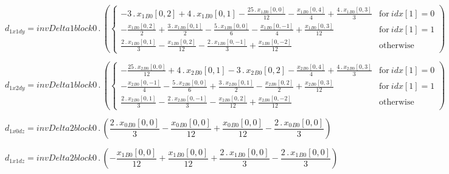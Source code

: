 \documentclass{article}
\begin{document}
\begin{dmath}d_{1 x1 dy} = invDelta1block0 \,.\, \left(\begin{cases} - 3 \,.\, {x_{1}{_{B0}}}[{0,2}] + 4 \,.\, {x_{1}{_{B0}}}[{0,1}] - \frac{25 \,.\, {x_{1}{_{B0}}}[{0,0}]}{12} - \frac{{x_{1}{_{B0}}}[{0,4}]}{4} + \frac{4 \,.\, 
{x_{1}{_{B0}}}[{0,3}]}{3} & \text{for}\: {idx}[{1}] = 0 \\- \frac{{x_{1}{_{B0}}}[{0,2}]}{2} + \frac{3 \,.\, {x_{1}{_{B0}}}[{0,1}]}{2} - \frac{5 \,.\, {x_{1}{_{B0}}}[{0,0}]}{6} - \frac{{x_{1}{_{B0}}}[{0,-1}]}{4} + \frac{{x_{1}{_{B0}}}[{0,3}]}{12} & 
\text{for}\: {idx}[{1}] = 1 \\\frac{2 \,.\, {x_{1}{_{B0}}}[{0,1}]}{3} - \frac{{x_{1}{_{B0}}}[{0,2}]}{12} - \frac{2 \,.\, {x_{1}{_{B0}}}[{0,-1}]}{3} + \frac{{x_{1}{_{B0}}}[{0,-2}]}{12} & \text{otherwise} \end{cases}\right)\end{dmath}

\begin{dmath}d_{1 x2 dy} = invDelta1block0 \,.\, \left(\begin{cases} - \frac{25 \,.\, {x_{2}{_{B0}}}[{0,0}]}{12} + 4 \,.\, {x_{2}{_{B0}}}[{0,1}] - 3 \,.\, {x_{2}{_{B0}}}[{0,2}] - \frac{{x_{2}{_{B0}}}[{0,4}]}{4} + \frac{4 \,.\, 
{x_{2}{_{B0}}}[{0,3}]}{3} & \text{for}\: {idx}[{1}] = 0 \\- \frac{{x_{2}{_{B0}}}[{0,-1}]}{4} - \frac{5 \,.\, {x_{2}{_{B0}}}[{0,0}]}{6} + \frac{3 \,.\, {x_{2}{_{B0}}}[{0,1}]}{2} - \frac{{x_{2}{_{B0}}}[{0,2}]}{2} + \frac{{x_{2}{_{B0}}}[{0,3}]}{12} & 
\text{for}\: {idx}[{1}] = 1 \\\frac{2 \,.\, {x_{2}{_{B0}}}[{0,1}]}{3} - \frac{2 \,.\, {x_{2}{_{B0}}}[{0,-1}]}{3} - \frac{{x_{2}{_{B0}}}[{0,2}]}{12} + \frac{{x_{2}{_{B0}}}[{0,-2}]}{12} & \text{otherwise} \end{cases}\right)\end{dmath}

\begin{dmath}d_{1 x0 dz} = invDelta2block0 \,.\, \left(\frac{2 \,.\, {x_{0}{_{B0}}}[{0,0}]}{3} - \frac{{x_{0}{_{B0}}}[{0,0}]}{12} + \frac{{x_{0}{_{B0}}}[{0,0}]}{12} - \frac{2 \,.\, {x_{0}{_{B0}}}[{0,0}]}{3}\right)\end{dmath}

\begin{dmath}d_{1 x1 dz} = invDelta2block0 \,.\, \left(- \frac{{x_{1}{_{B0}}}[{0,0}]}{12} + \frac{{x_{1}{_{B0}}}[{0,0}]}{12} + \frac{2 \,.\, {x_{1}{_{B0}}}[{0,0}]}{3} - \frac{2 \,.\, {x_{1}{_{B0}}}[{0,0}]}{3}\right)\end{dmath}
\end{document}
